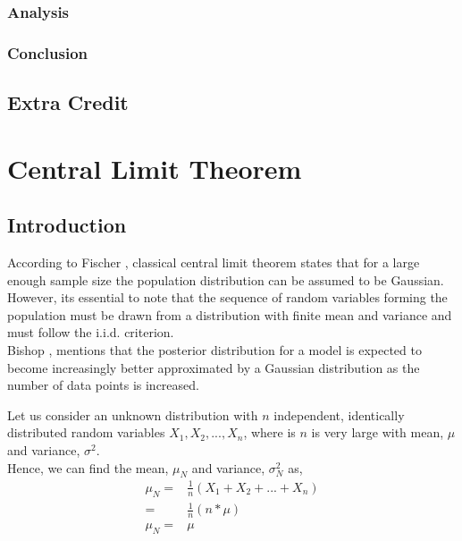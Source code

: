 \documentclass[12pt,twoside,a4paper]{article}
\begin{document}
\subsubsection{Analysis}

\subsubsection{Conclusion}

\subsection{Extra Credit}

\pagebreak
\section{Central Limit Theorem}

\subsection{Introduction}

According to Fischer \cite{CLT}, classical central limit theorem states that for a large enough sample size the population distribution can be assumed to be Gaussian. However, its essential to note that the sequence of random variables forming the population must be drawn from a distribution with finite mean and variance and must follow the i.i.d. criterion. \\
Bishop \cite{ChrisPRML}, mentions that the posterior distribution for a model is expected to become increasingly better approximated by a Gaussian distribution as the number of data points is increased.

Let us consider an unknown distribution with $n$ independent, identically distributed random variables $X_1, X_2, ..., X_n$, where is $n$ is very large with mean, $\mu$ and variance, $\sigma^2$. \\

Hence, we can find the mean, $\mu_N$ and variance, $\sigma^2_N$ as,
\begin{align}
\mu_N =& \frac{1}{n}(X_1+X_2+...+X_n) \\
      =& \frac{1}{n}(n*\mu) \\
\mu_N =& \mu
\end{align}
\end{document}
